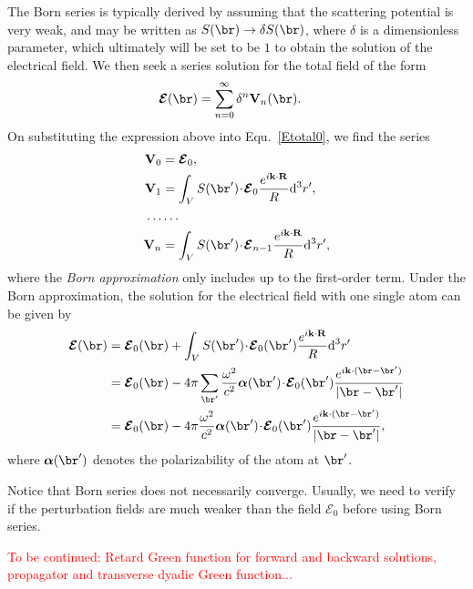 \documentclass[]{report}
\begin{document}
The Born series is typically derived by assuming that the scattering potential is very
weak, and may be written as $ S(\br)\rightarrow \delta S(\br) $, where $ \delta $ is a dimensionless parameter, which ultimately will be set to be $ 1 $ to obtain the solution of the electrical field. We then seek a series solution for the total field of the form
\begin{align}
\boldsymbol{\mathcal{E}}(\br) &= \sum_{n=0}^{\infty} \delta^n \mathbf{V}_n(\br).
\end{align}
On substituting the expression above into Equ.~\ref{Etotal0}, we find the series
\begin{align}
\mathbf{V}_0 &= \boldsymbol{\mathcal{E}}_0,\\
\mathbf{V}_1 &= \int_V S(\br')\! \cdot\! \boldsymbol{\mathcal{E}}_0 \frac{e^{i\mathbf{k}\cdot \mathbf{R}}}{R} \mathrm{d}^3 r',\\
\ldots & \ldots\\
\mathbf{V}_n &= \int_V S(\br') \! \cdot\!\boldsymbol{\mathcal{E}}_{n-1} \frac{e^{i\mathbf{k}\cdot \mathbf{R}}}{R} \mathrm{d}^3 r',
\end{align}
where the \textit{Born approximation} only includes up to the first-order term. Under the Born approximation, the solution for the electrical field with one single atom can be given by
\begin{align}
\boldsymbol{\mathcal{E}} (\br) &= \boldsymbol{\mathcal{E}}_0 (\br) + \int_V S(\br')\! \cdot\! \boldsymbol{\mathcal{E}}_0 (\br') \frac{e^{i\mathbf{k}\cdot \mathbf{R}}}{R} \mathrm{d}^3 r'\\
&= \boldsymbol{\mathcal{E}}_0(\br) -4\pi \sum_{\br'}\frac{\omega^2}{c^2} \boldsymbol{\alpha}(\br') \! \cdot\!\boldsymbol{\mathcal{E}}_0 (\br')\frac{e^{i\mathbf{k}\cdot (\br-\br')}}{|\br-\br'|}\\
&=\boldsymbol{\mathcal{E}}_0(\br) -4\pi \frac{\omega^2}{c^2} \boldsymbol{\alpha}(\br')\! \cdot\! \boldsymbol{\mathcal{E}}_0 (\br')\frac{e^{i\mathbf{k}\cdot (\br-\br')}}{|\br-\br'|},
\end{align}
where $ \boldsymbol{\alpha}(\br') $ denotes the polarizability of the atom at $ \br' $. 

Notice that Born series does not necessarily converge. Usually, we need to verify if the perturbation fields are much weaker than the field $ \boldsymbol{\mathcal{E}}_0 $ before using Born series. 

\textcolor{red}{To be continued: Retard Green function for forward and backward solutions, propagator and transverse dyadic Green function...}
\end{document}
